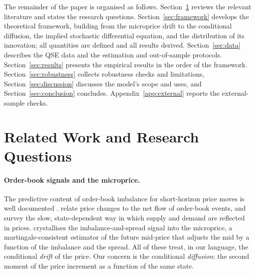 \documentclass[11pt]{article}
\theoremstyle{plain}
\theoremstyle{definition}
\begin{document}
The remainder of the paper is organised as follows.
Section~\ref{sec:related} reviews the relevant literature and states the research
questions. Section~\ref{sec:framework} develops the theoretical framework, building
from the microprice drift to the conditional diffusion, the implied stochastic
differential equation, and the distribution of its innovation; all quantities are
defined and all results derived. Section~\ref{sec:data} describes the QSE data and
the estimation and out-of-sample protocols. Section~\ref{sec:results} presents the
empirical results in the order of the framework. Section~\ref{sec:robustness}
collects robustness checks and limitations, Section~\ref{sec:discussion} discusses
the model's scope and uses, and Section~\ref{sec:conclusion} concludes.
Appendix~\ref{app:external} reports the external-sample checks.

\section{Related Work and Research Questions}
\label{sec:related}

\paragraph{Order-book signals and the microprice.}
The predictive content of order-book imbalance for short-horizon price moves is
well documented \citep{ohara1995,hasbrouck2007,gould2013}. \citet{cont2014} relate
price changes to the net flow of order-book events, and \citet{bouchaud2009} survey
the slow, state-dependent way in which supply and demand are reflected in prices.
\citet{stoikov2018} crystallises the imbalance-and-spread signal into the
microprice, a martingale-consistent estimator of the future mid-price that adjusts
the mid by a function of the imbalance and the spread. All of these treat, in our
language, the conditional \emph{drift} of the price. Our concern is the conditional
\emph{diffusion}: the second moment of the price increment as a function of the same
state.
\end{document}
